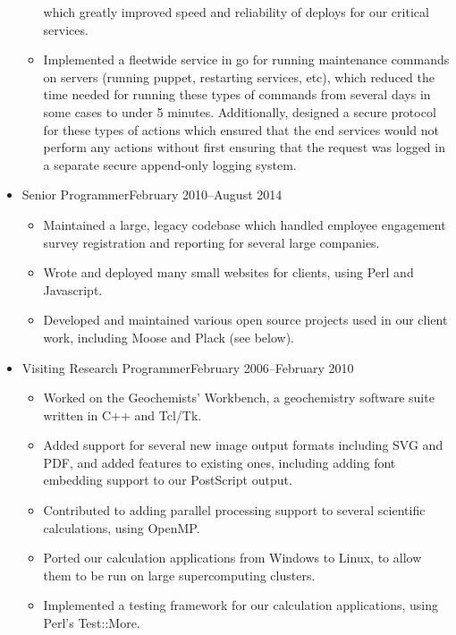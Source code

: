 \documentclass[letterpaper]{article}
\begin{document}
\begin{itemize}
\begin{itemize}
                which greatly improved speed and reliability of deploys for our
                critical services.
            \item Implemented a fleetwide service in go for running maintenance
                commands on servers (running puppet, restarting services, etc),
                which reduced the time needed for running these types of
                commands from several days in some cases to under 5 minutes.
                Additionally, designed a secure protocol for these types of
                actions which ensured that the end services would not perform
                any actions without first ensuring that the request was logged
                in a separate secure append-only logging system.
        \end{itemize}
    \item {}
                        {Senior Programmer}{February 2010--August 2014}
        \begin{itemize}
            \item Maintained a large, legacy codebase which handled employee
                engagement survey registration and reporting for several large
                companies.
            \item Wrote and deployed many small websites for clients, using
                Perl and Javascript.
            \item Developed and maintained various open source projects used in
                our client work, including Moose and Plack (see below).
        \end{itemize}
    \item {}
                        {Visiting Research Programmer}{February 2006--February 2010}
        \begin{itemize}
            \item Worked on the Geochemists' Workbench, a geochemistry software
                suite written in C++ and Tcl/Tk.
            \item Added support for several new image output formats including
                SVG and PDF, and added features to existing ones, including
                adding font embedding support to our PostScript output.
            \item Contributed to adding parallel processing support to several
                scientific calculations, using OpenMP.
            \item Ported our calculation applications from Windows to Linux, to
                allow them to be run on large supercomputing clusters.
            \item Implemented a testing framework for our calculation
                applications, using Perl's Test::More.
        \end{itemize}
\end{itemize}
\end{document}
